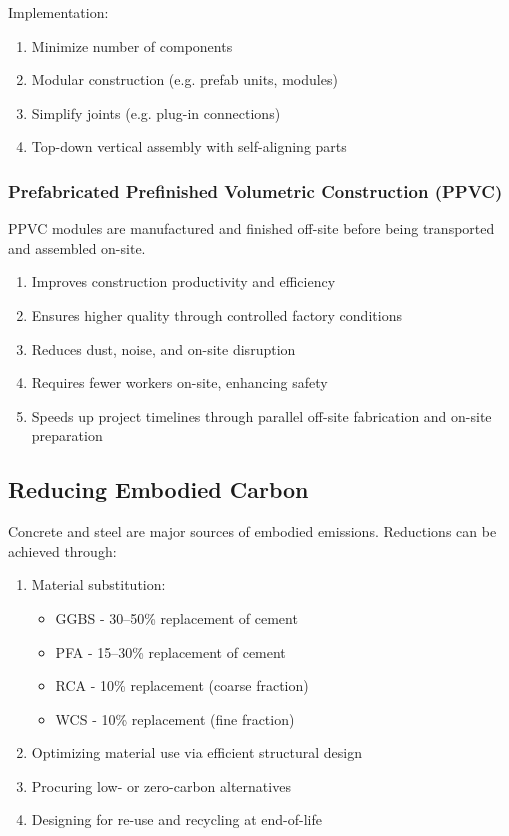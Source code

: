 \documentclass[12pt, a4paper]{article}
\begin{document}
\begin{multicols*}{3}
Implementation:
\begin{enumerate}[\roman*.]
  \item Minimize number of components
  \item Modular construction (e.g. prefab units, modules)
  \item Simplify joints (e.g. plug-in connections)
  \item Top-down vertical assembly with self-aligning parts
\end{enumerate}

\subsubsection{Prefabricated Prefinished Volumetric Construction (PPVC)}
PPVC modules are manufactured and finished off-site before being transported and assembled on-site.
\begin{enumerate}[\roman*.]
  \item Improves construction productivity and efficiency
  \item Ensures higher quality through controlled factory conditions
  \item Reduces dust, noise, and on-site disruption
  \item Requires fewer workers on-site, enhancing safety
  \item Speeds up project timelines through parallel off-site fabrication and on-site preparation
\end{enumerate}

\subsection{Reducing Embodied Carbon}
Concrete and steel are major sources of embodied emissions. Reductions can be achieved through:
\begin{enumerate}[\roman*.]
  \item Material substitution:
    \begin{itemize}[leftmargin=*]\vspace{3pt}
      \item GGBS - 30--50\% replacement of cement
      \item PFA - 15--30\% replacement of cement
      \item RCA - 10\% replacement (coarse fraction)
      \item WCS - 10\% replacement (fine fraction)
    \end{itemize}
  \item Optimizing material use via efficient structural design
  \item Procuring low- or zero-carbon alternatives 
  \item Designing for re-use and recycling at end-of-life
\end{enumerate}


\end{multicols*}
\end{document}

